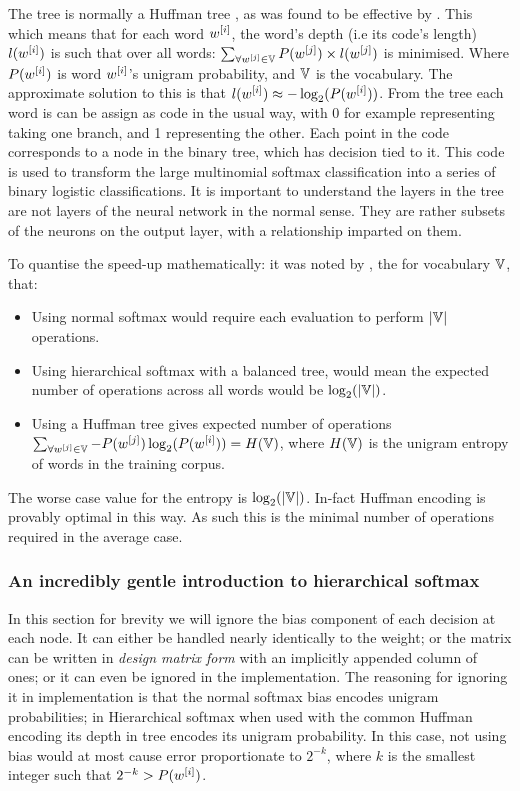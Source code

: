 \documentclass[parskip]{komatufte}
\begin{document}
The tree is normally a Huffman tree , as was found to be effective by .
This which means that for each word $\n w_i$, the word's depth (i.e its code's length) $l(\n w_i)$ is such that over all words:
 $\sum_{\forall \n w_j \in \set{V}} P(\n w_j)\times l(\n w_j)$ is minimised.
Where $P(\n w_i)$ is word $\n w_i$'s unigram probability, and $\mathbb{V}$ is the vocabulary.
The approximate solution to this is that $l(\n w_i) \approx -\log_2(P(\n w_i))$.
From the tree each word is can be assign as code in the usual way, with 0 for example representing taking one branch, and 1 representing the other.
Each point in the code corresponds to a node in the binary tree, which has decision tied to it.
This code is used to transform the large  multinomial softmax classification into a series of binary logistic classifications.
It is important to understand the layers in the tree are not layers of the neural network in the normal sense.
They are rather subsets of the neurons on the output layer, with a relationship imparted on them.

To quantise the speed-up mathematically:
it was noted by , the for vocabulary $\mathbb{V}$, that:
\begin{itemize}
	\item Using normal softmax would require each evaluation to perform $|\mathbb{V}|$ operations.
	\item Using hierarchical softmax with a balanced tree, would mean the expected number of operations across all words would be $\log_2(|\mathbb{V}|)$.
	\item Using a Huffman tree gives expected number of operations $\sum_{\forall \n w_j \in \set{V}} -P(\n w_j)\log_2(P(\n w_i)) = H(\set{V})$, where $H(\mathbb{V})$ is the unigram entropy of words in the training corpus.
\end{itemize}
The worse case value for the entropy is $\log_2(|\mathbb{V}|)$.
In-fact Huffman encoding is provably optimal in this way.
As such this is the minimal number of operations required in the average case.


\subsubsection{An incredibly gentle introduction to hierarchical softmax}

In this section for brevity we will ignore the bias component of each decision at each node.
It can either be handled nearly identically to the weight;
or the matrix can be written in \emph{design matrix form} with an implicitly appended column of ones;
or it can even be ignored in the implementation.
The reasoning for ignoring it in implementation is that the normal softmax bias encodes unigram probabilities;
in Hierarchical softmax when used with the common Huffman encoding its depth in tree encodes its unigram probability. In this case, not using bias would at most cause error proportionate to $2^{-k}$, where $k$ is the smallest integer such that $2^{-k}>P(\n w_i)$.
\end{document}
